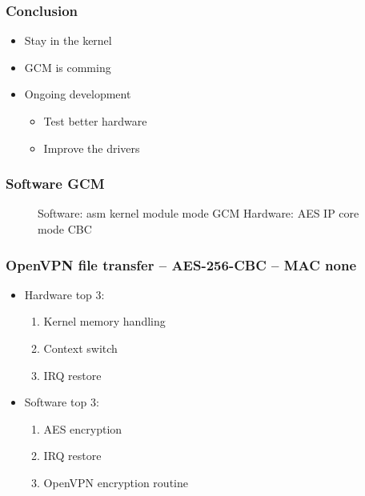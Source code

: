\documentclass[xcolor={x11names, rgb, usenames, dvipsnames}]{beamer}
\begin{document}
\begin{frame}
\frametitle{Conclusion}
\begin{itemize}
	\item Stay in the kernel
	\item GCM is comming
	\item Ongoing development
	\begin{itemize}
		\item Test better hardware
		\item Improve the drivers
	\end{itemize}
\end{itemize}

\end{frame}






\begin{frame}[noframenumbering]
\frametitle{Software GCM}
	\begin{figure}
	
	\caption{Software: asm kernel module mode GCM\newline{} Hardware: AES IP core mode CBC}
	\end{figure}
\end{frame}

\begin{frame}[noframenumbering]
\frametitle{OpenVPN file transfer -- AES-256-CBC -- MAC none}
	\begin{itemize}
		\item Hardware top 3:
		\begin{enumerate}
			\item Kernel memory handling
			\item Context switch
			\item IRQ restore
		\end{enumerate}
		\item Software top 3:
		\begin{enumerate}
			\item AES encryption
			\item IRQ restore
			\item OpenVPN encryption routine
		\end{enumerate}
	\end{itemize}
\end{frame}
\end{document}
